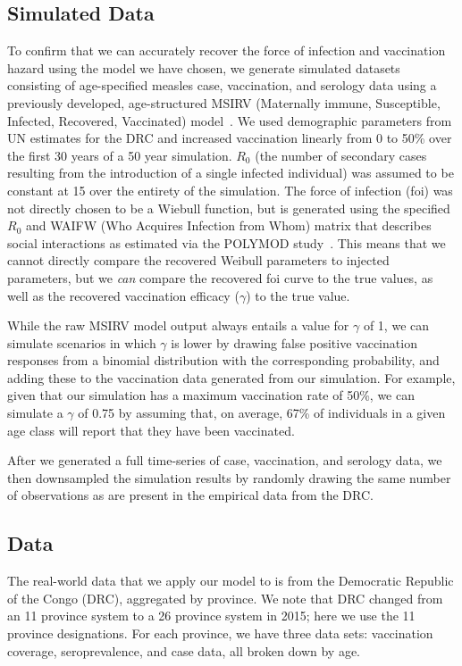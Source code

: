 \documentclass[nofootinbib,aps,pre,twocolumn,superscriptaddress,showkeys,showpacs]{revtex4-1}
\begin{document}
\subsection{Simulated Data\label{subsec:SimData}}
To confirm that we can accurately recover the force of infection and vaccination hazard using the model we have chosen, we generate simulated datasets consisting of age-specified measles case, vaccination, and serology data using a previously developed, age-structured MSIRV (Maternally immune, Susceptible, Infected, Recovered, Vaccinated) model~\cite{Metcalf2012}. We used demographic parameters from UN estimates for the DRC and increased vaccination linearly from 0 to 50\% over the first 30 years of a 50 year simulation. $R_{0}$ (the number of secondary cases resulting from the introduction of a single infected individual) was assumed to be constant at 15 over the entirety of the simulation. The force of infection (foi) was not directly chosen to be a Wiebull function, but is generated using the specified $R_0$ and WAIFW (Who Acquires Infection from Whom) matrix that describes social interactions as estimated via the POLYMOD study~\cite{Polymod}. This means that we cannot directly compare the recovered Weibull parameters to injected parameters, but we \emph{can} compare the recovered foi curve to the true values, as well as the recovered vaccination efficacy ($\gamma$) to the true value. 

While the raw MSIRV model output always entails a value for $\gamma$ of 1, we can simulate scenarios in which $\gamma$ is lower by drawing false positive vaccination responses from a binomial distribution with the corresponding probability, and adding these to the vaccination data generated from our simulation. For example, given that our simulation has a maximum vaccination rate of 50\%, we can simulate a $\gamma$ of 0.75 by assuming that, on average, 67\% of individuals in a given age class will report that they have been vaccinated.

After we generated a full time-series of case, vaccination, and serology data, we then downsampled the simulation results by randomly drawing the same number of observations as are present in the empirical data from the DRC.

\subsection{Data \label{subsec:Data}}
The real-world data that we apply our model to is from the Democratic Republic of the Congo (DRC), aggregated by province. We note that DRC changed from an 11 province system to a 26 province system in 2015; here we use the 11 province designations. For each province, we have three data sets: vaccination coverage, seroprevalence, and case data, all broken down by age. 
\end{document}
